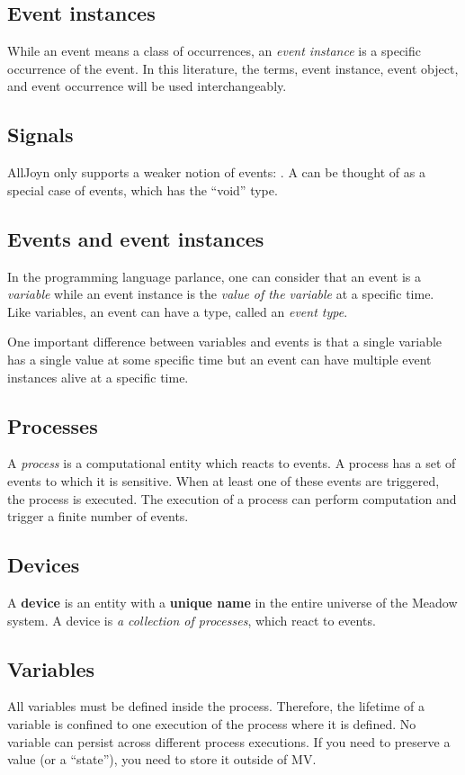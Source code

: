\documentclass{pamsbook}
\begin{document}
\subsection{Event instances}
While an event means a class of occurrences, an {\em event instance}
is a specific occurrence of the event. In this literature, the terms, event
instance, event object, and event occurrence will be used interchangeably.

\subsection{Signals} AllJoyn only supports a weaker notion of events:
.  A  can be thought of as a special case of events,
which has the ``void'' type. 

\subsection{Events and event instances}
In the programming language parlance, one can consider that an event is a {\em
  variable\/} while an event instance is the {\em value of the variable\/} at
a specific time. Like variables, an event can have a type, called an {\em
  event type\/}.  

One important difference between variables and events is
that a single variable has a single value at some specific time but an event
can have multiple event instances alive at a specific time. 

\subsection{Processes}
A {\em process\/} is a computational entity which reacts to events. A process
has a set of events to which it is sensitive. When at least one of these
events are triggered, the process is executed. The execution of a process can
perform computation and trigger a finite number of events.

\subsection{Devices}
A {\bf device\/} is an entity with a {\bf unique name} in the
entire universe of the Meadow system. A device is {\em a collection of
  processes\/}, which react to events.

\subsection{Variables}
All variables must be defined inside the process. Therefore, the lifetime 
of a variable is confined to one execution of the process where it is defined.
No variable can persist across different process executions. If you need to
preserve a value (or a ``state''), you need to store it outside of MV.
\end{document}

